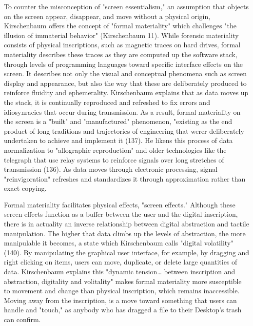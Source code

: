 \documentclass[11pt]{article}
\begin{document}
To counter the misconception of "screen essentialism," an assumption
that objects on the screen appear, disappear, and move without a
physical origin, Kirschenbaum offers the concept of "formal
materiality" which challenges "the illusion of immaterial behavior"
(Kirschenbaum 11). While forensic materiality consists of physical
inscriptions, such as magnetic traces on hard drives, formal
materiality describes these traces as they are computed up the
software stack, through levels of programming languages toward
specific interface effects on the screen. It describes not only the
visual and conceptual phenomena such as screen display and appearance,
but also the way that these are deliberately produced to reinforce
fluidity and ephemerality. Kirschenbaum explains that as data moves up
the stack, it is continually reproduced and refreshed to fix errors
and idiosynracies that occur during transmission. As a result, formal
materiality on the screen is a "built" and "manufactured" phenomenon,
"existing as the end product of long traditions and trajectories of
engineering that werer deliberately undertaken to achieve and
implement it (137). He likens this process of data normalization to
"allographic reproduction" and older technologies like the telegraph
that use relay systems to reinforce signals over long stretches of
transmission (136). As data moves through electronic processing,
signal "reinvigoration" refreshes and standardizes it through
approximation rather than exact copying.

Formal materiality facilitates physical effects, "screen effects."
Although these screen effects function as a buffer between the user
and the digital inscription, there is in actuality an inverse
relationship between digital abstraction and tactile manipulation. The
higher that data climbs up the levels of abstraction, the more
manipulable it becomes, a state which Kirschenbaum calls "digital
volatility" (140). By manipulating the graphical user interface, for
example, by dragging and right clicking on items, users can move,
duplicate, or delete large quantities of data. Kirschenbaum explains
this "dynamic tension\ldots{} between inscription and abstraction,
digitality and volitality" makes formal materiality more susceptible
to movement and change than physical inscription, which remains
inaccessible. Moving away from the inscription, is a move toward
something that users can handle and "touch," as anybody who has
dragged a file to their Desktop's trash can confirm.
\end{document}
